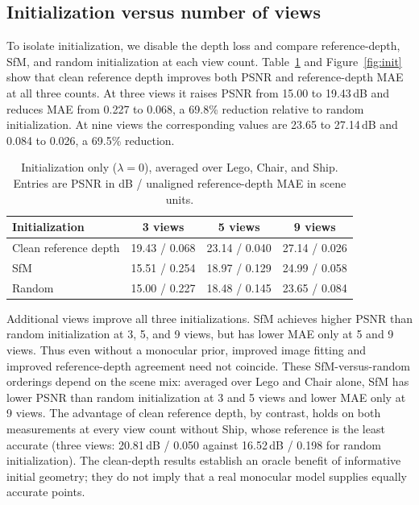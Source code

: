 \documentclass[10pt,a4paper]{article}
\begin{document}
\subsection{Initialization versus number of views}\label{sec:init}

To isolate initialization, we disable the depth loss and compare reference-depth,
SfM, and random initialization at each view count. Table~\ref{tab:init} and
Figure~\ref{fig:init} show that clean reference depth improves both PSNR and
reference-depth MAE at all three counts. At three views it raises PSNR from 15.00 to
19.43\,dB and reduces MAE from 0.227 to 0.068, a 69.8\% reduction relative to random
initialization. At nine views the corresponding values are 23.65 to 27.14\,dB and
0.084 to 0.026, a 69.5\% reduction.

\begin{table}[!htbp]\centering\small
\caption{Initialization only ($\lambda=0$), averaged over Lego, Chair, and Ship.
Entries are PSNR in dB / unaligned reference-depth MAE in scene units.}
\label{tab:init}
\begin{tabular}{lccc}
\toprule
Initialization & 3 views & 5 views & 9 views\\
\midrule
Clean reference depth & 19.43 / 0.068 & 23.14 / 0.040 & 27.14 / 0.026\\
SfM & 15.51 / 0.254 & 18.97 / 0.129 & 24.99 / 0.058\\
Random & 15.00 / 0.227 & 18.48 / 0.145 & 23.65 / 0.084\\
\bottomrule
\end{tabular}
\end{table}

Additional views improve all three initializations. SfM achieves higher PSNR than
random initialization at 3, 5, and 9 views, but has lower MAE only at 5 and 9 views.
Thus even without a monocular prior, improved image fitting and improved
reference-depth agreement need not coincide. These SfM-versus-random orderings depend
on the scene mix: averaged over Lego and Chair alone, SfM has lower PSNR than random
initialization at 3 and 5 views and lower MAE only at 9 views. The advantage of clean
reference depth, by contrast, holds on both measurements at every view count without
Ship, whose reference is the least accurate (three views: 20.81\,dB / 0.050 against
16.52\,dB / 0.198 for random initialization). The clean-depth results establish an
oracle benefit of informative initial geometry; they do not imply that a real
monocular model supplies equally accurate points.
\end{document}
